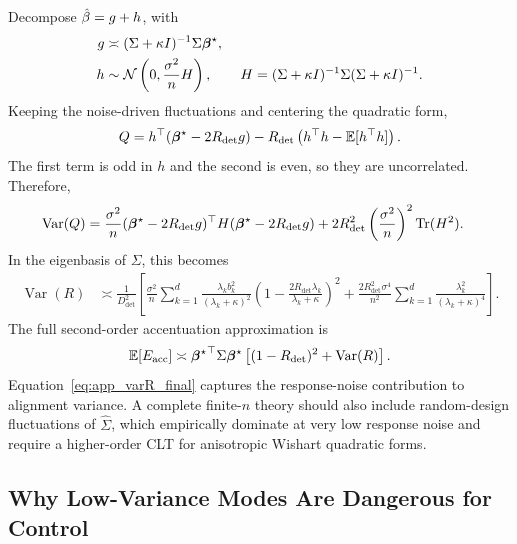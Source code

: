 Decompose $\hat{\beta}=g+h$, with
\begin{align}
    g &\asymp (\Sigma+\kappa I)^{-1}\Sigma\boldsymbol{\beta}^{\star},\\
    h &\sim
    \mathcal{N}\left(0,\frac{\sigma^2}{n}H\right),
    \qquad
    H=(\Sigma+\kappa I)^{-1}\Sigma(\Sigma+\kappa I)^{-1}.
\end{align}
Keeping the noise-driven fluctuations and centering the quadratic form,
\begin{equation}
    Q
    =
    h^\top(\boldsymbol{\beta}^{\star}-2R_{\det}g)
    -
    R_{\det}\left(h^\top h-\mathbb{E}[h^\top h]\right).
\end{equation}
The first term is odd in $h$ and the second is even, so they are uncorrelated. Therefore,
\begin{align}
    \operatorname{Var}(Q)
    &=
    \frac{\sigma^2}{n}
    (\boldsymbol{\beta}^{\star}-2R_{\det}g)^\top H(\boldsymbol{\beta}^{\star}-2R_{\det}g)
    +
    2R_{\det}^2
    \left(\frac{\sigma^2}{n}\right)^2
    \operatorname{Tr}(H^2).
\end{align}
In the eigenbasis of $\Sigma$, this becomes
\begin{align}
    \operatorname{Var}(R)
    &\asymp
    \frac{1}{D_{\det}^2}
    \left[
    \frac{\sigma^2}{n}
    \sum_{k=1}^{d}
    \frac{\lambda_k b_k^2}{(\lambda_k+\kappa)^2}
    \left(1-\frac{2R_{\det}\lambda_k}{\lambda_k+\kappa}\right)^2
    +
    \frac{2R_{\det}^2\sigma^4}{n^2}
    \sum_{k=1}^{d}
    \frac{\lambda_k^2}{(\lambda_k+\kappa)^4}
    \right].
    \label{eq:app_varR_final}
\end{align}
The full second-order accentuation approximation is
\begin{equation}
    \mathbb{E}[E_{\mathrm{acc}}]
    \asymp
    {\boldsymbol{\beta}^{\star}}^{\top}\Sigma\boldsymbol{\beta}^{\star}
    \left[
    (1-R_{\det})^2+\operatorname{Var}(R)
    \right].
    \label{eq:app_acc_full}
\end{equation}
Equation~\eqref{eq:app_varR_final} captures the response-noise contribution to alignment variance. A complete finite-$n$ theory should also include random-design fluctuations of $\widehat{\Sigma}$, which empirically dominate at very low response noise and require a higher-order CLT for anisotropic Wishart quadratic forms.

\subsection{Why Low-Variance Modes Are Dangerous for Control}

